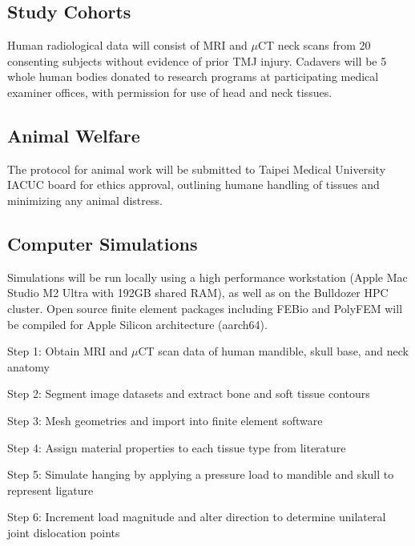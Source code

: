 \documentclass{article}
\newcommand{\tmu}{Taipei Medical University }
\begin{document}
\subsection{Study Cohorts}
Human radiological data will consist of MRI and $\mu$CT neck scans from 20 consenting subjects without evidence of prior TMJ injury.
Cadavers will be 5 whole human bodies donated to research programs at participating medical examiner offices, with permission for use of head and neck tissues.

\subsection{Animal Welfare}
The protocol for animal work will be submitted to \tmu IACUC board for ethics approval, outlining humane handling of tissues and minimizing any animal distress.


\subsection{Computer Simulations}
Simulations will be run locally using a high performance workstation (Apple Mac Studio M2 Ultra with 192GB shared RAM), as well as on the Bulldozer HPC cluster. Open source finite element packages including FEBio and PolyFEM will be compiled for Apple Silicon architecture (aarch64).

\begin{outline}
    
\1 Step 1: Obtain MRI and $\mu$CT scan data of human mandible, skull base, and neck anatomy

\1 Step 2: Segment image datasets and extract bone and soft tissue contours

\1 Step 3: Mesh geometries and import into finite element software

\1 Step 4: Assign material properties to each tissue type from literature

\1 Step 5: Simulate hanging by applying a pressure load to mandible and skull to represent ligature 

\1 Step 6: Increment load magnitude and alter direction to determine unilateral joint dislocation points

\end{outline}
\end{document}
